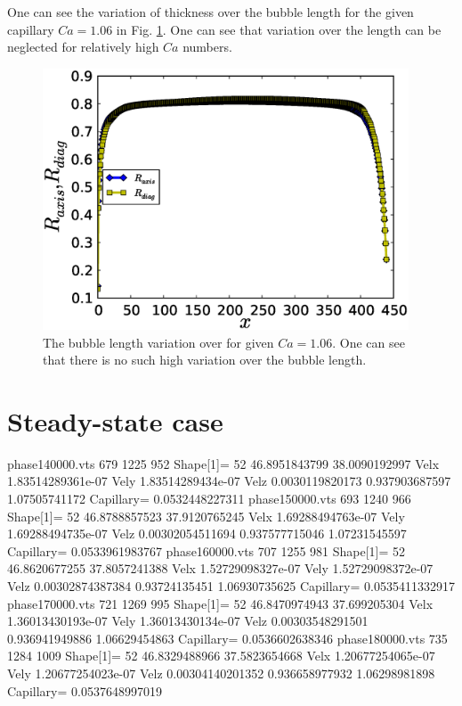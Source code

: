 \documentclass{article}
\begin{document}
One can see the variation of thickness over the bubble length for the given capillary $Ca=1.06$ in
Fig. \ref{fig:variation:bubble:ca:one}. One can see that variation over the length can be neglected
for relatively high $Ca$ numbers.
\begin{figure}
\includegraphics[width=0.97\textwidth]{Figures/bubble_length_ca_one.eps}
\caption{The bubble length variation over for given $Ca=1.06$.
One can see that there is no such high variation over the bubble
length. \label{fig:variation:bubble:ca:one}}
\end{figure}


\section{Steady-state case}
phase140000.vts
679 1225
952
Shape[1]= 52
46.8951843799
38.0090192997
Velx 1.83514289361e-07
Vely 1.83514289434e-07
Velz 0.0030119820173
0.937903687597 1.07505741172
Capillary= 0.0532448227311
phase150000.vts
693 1240
966
Shape[1]= 52
46.8788857523
37.9120765245
Velx 1.69288494763e-07
Vely 1.69288494735e-07
Velz 0.00302054511694
0.937577715046 1.07231545597
Capillary= 0.0533961983767
phase160000.vts
707 1255
981
Shape[1]= 52
46.8620677255
37.8057241388
Velx 1.52729098327e-07
Vely 1.52729098372e-07
Velz 0.00302874387384
0.93724135451 1.06930735625
Capillary= 0.0535411332917
phase170000.vts
721 1269
995
Shape[1]= 52
46.8470974943
37.699205304
Velx 1.36013430193e-07
Vely 1.36013430134e-07
Velz 0.00303548291501
0.936941949886 1.06629454863
Capillary= 0.0536602638346
phase180000.vts
735 1284
1009
Shape[1]= 52
46.8329488966
37.5823654668
Velx 1.20677254065e-07
Vely 1.20677254023e-07
Velz 0.00304140201352
0.936658977932 1.06298981898
Capillary= 0.0537648997019
\end{document}
